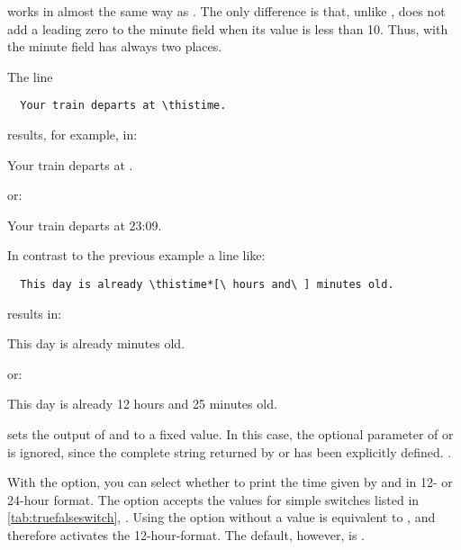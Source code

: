 works in almost the same way as . The only
difference is that, unlike ,  does not add a
leading zero to the minute field when its value is less than 10. Thus, with
 the minute field has always two places.
\begin{Example}
  The line
\begin{lstlisting}
  Your train departs at \thistime.
\end{lstlisting}
  results, for example, in:
  \begin{ShowOutput}
    Your train departs at \thistime.
  \end{ShowOutput}
  or:
  \begin{ShowOutput}
    Your train departs at 23:09.
  \end{ShowOutput}
  \bigskip
  In contrast to the previous example a line like:
\begin{lstlisting}
  This day is already \thistime*[\ hours and\ ] minutes old.
\end{lstlisting}
  results in:
  \begin{ShowOutput}
    This day is already  minutes old.
  \end{ShowOutput}
  or:
  \begin{ShowOutput}
    This day is already 12 hours and 25 minutes old.
  \end{ShowOutput}
\end{Example}
\EndIndexGroup


\begin{Declaration}%
\end{Declaration}%
 sets the output of  and
 to a fixed value. In this case, the optional
parameter of  or 
is ignored, since the complete string returned by
 or  has been
explicitly defined. .%
\EndIndexGroup


\begin{Declaration}
\end{Declaration}%
%
With the  option, you can
select whether to print the time given by  and
 in 12- or 24-hour format. The option accepts
the values for simple switches listed in \autoref{tab:truefalseswitch},
. Using the option without a value is
equivalent to , and therefore activates the
12-hour-format. The default, however, is .

